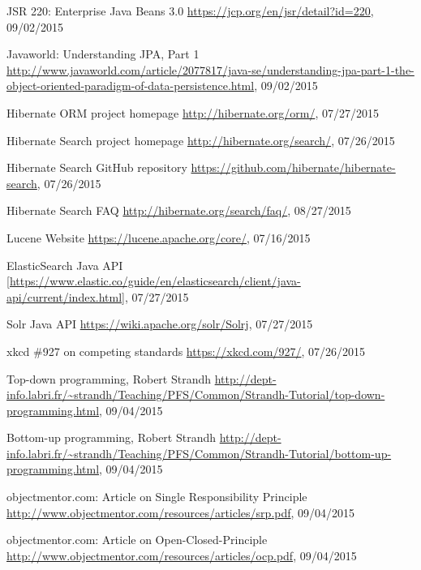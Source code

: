 %
%
\begin{thebibliography}{100}
	
	 JSR 220: Enterprise Java Beans 3.0
	\url{https://jcp.org/en/jsr/detail?id=220}, 09/02/2015
	
	 Javaworld: Understanding JPA, Part 1
	\url{http://www.javaworld.com/article/2077817/java-se/understanding-jpa-part-1-the-object-oriented-paradigm-of-data-persistence.html}, 09/02/2015
	
	 Hibernate ORM project homepage
	\url{http://hibernate.org/orm/}, 07/27/2015
	
	 Hibernate Search project homepage
	\url{http://hibernate.org/search/}, 07/26/2015
	
	 Hibernate Search GitHub repository
	\url{https://github.com/hibernate/hibernate-search}, 07/26/2015
	
	 Hibernate Search FAQ
	\url{http://hibernate.org/search/faq/}, 08/27/2015
	
	 Lucene Website
	\url{https://lucene.apache.org/core/}, 07/16/2015
	
	 ElasticSearch Java API
	\url{[https://www.elastic.co/guide/en/elasticsearch/client/java-api/current/index.html]}, 07/27/2015
	
	 Solr Java API
	\url{https://wiki.apache.org/solr/Solrj}, 07/27/2015
	
	 xkcd \#927 on competing standards
	\url{https://xkcd.com/927/}, 07/26/2015
	
	 Top-down programming, Robert Strandh
	\url{http://dept-info.labri.fr/~strandh/Teaching/PFS/Common/Strandh-Tutorial/top-down-programming.html},
	09/04/2015
	
	 Bottom-up programming, Robert Strandh
	\url{http://dept-info.labri.fr/~strandh/Teaching/PFS/Common/Strandh-Tutorial/bottom-up-programming.html},
	09/04/2015
	
	 objectmentor.com: Article on Single Responsibility Principle
	\url{http://www.objectmentor.com/resources/articles/srp.pdf}, 09/04/2015
	
	 objectmentor.com: Article on Open-Closed-Principle
	\url{http://www.objectmentor.com/resources/articles/ocp.pdf}, 09/04/2015
	

\end{thebibliography}
